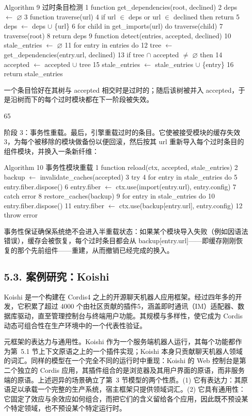 Algorithm 9 过时条目检测 1 function get\_dependencies(root,
declined) 2 deps $\leftarrow$ $\varnothing$ 3 function traverse(url) 4 if url $\in$ deps or url $\in$
declined then return 5 deps $\leftarrow$ deps $\cup$ \{url\} 6 for child in
get\_imports(url) do traverse(child) 7 traverse(root) 8 return deps 9
function detect(entries, accepted, declined) 10 stale\_entries $\leftarrow$ $\varnothing$ 11
for entry in entries do 12 tree $\leftarrow$ get\_dependencies(entry.url, declined)
13 if tree $\cap$ accepted $\neq$ $\varnothing$ then 14 accepted $\leftarrow$ accepted $\cup$ tree 15
stale\_entries $\leftarrow$ stale\_entries $\cup$ \{entry\} 16 return stale\_entries

一个条目恰好在其树与 accepted 相交时是过时的；随后该树被并入 accepted，于是沿树而下的每个过时模块都在下一阶段被失效。

65

阶段 3：事务性重载。最后，引擎重载过时的条目。它使被接受模块的缓存失效3，为每个被移除的模块做备份以便回滚，然后按其 url 重新导入每个过时条目的组件模块，并换入一条新纤维：

Algorithm 10 事务性模块重载 1 function reload(ctx,
accepted, stale\_entries) 2 backup $\leftarrow$ invalidate\_caches(accepted) 3 try
4 for entry in stale\_entries do 5 entry.fiber.dispose() 6 entry.fiber $\leftarrow$
ctx.use(import(entry.url), entry.config) 7 catch error 8
restore\_caches(backup) 9 for entry in stale\_entries do 10
entry.fiber.dispose() 11 entry.fiber $\leftarrow$ ctx.use(backup{[}entry.url{]},
entry.config) 12 throw error

事务性保证确保系统绝不会进入半重载状态：如果某个模块导入失败（例如因语法错误），缓存会被恢复，每个过时条目都会从 backup{[}entry.url{]}——即缓存刚刚恢复的那个先前组件——重建，从而撤销已经完成的换入。

\subsection{5.3. 案例研究：Koishi}\label{case-study-koishi}

Koishi 是一个构建在 Cordis4 之上的开源聊天机器人应用框架。经过四年多的开发，它积累了超过 4000 个由社区贡献的插件5，涵盖即时通讯（IM）适配器、数据库驱动，直至管理控制台与终端用户功能。其规模与多样性，使它成为 Cordis 动态可组合性在生产环境中的一个代表性验证。

元框架的表达力与通用性。Koishi 作为一个服务端机器人运行，其每个功能都作为第~5.1 节上下文原语之上的一个插件实现；Koishi 本身只贡献聊天机器人领域的词汇。同样的模型在一个完全不同的运行时中重现：Koishi 的 Web 控制台是第二个独立的 Cordis 应用，其插件组合的是浏览器及其用户界面的原语，而非服务端的原语。上述迥异的场景确立了第~3 节模型的两个性质。(1) 它有表达力：其原语足以承载一个完整的生产系统，宿主框架只提供领域词汇。(2) 它具有通用性：它固定了效应与余效应如何组合，而把它们的含义留给各个应用，因此既不预设某个特定领域，也不预设某个特定运行时。

